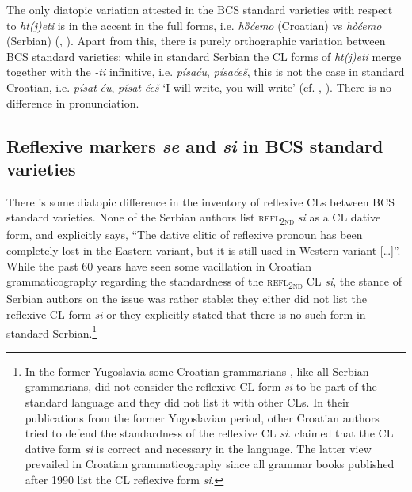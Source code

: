 The only diatopic variation attested in the BCS standard varieties with respect to \textit{ht(j)eti} is in the accent in the full forms, i.e. \textit{hȍćemo} (Croatian) vs \textit{hòćemo} (Serbian) (\citealt[cf.][272]{Baric97}, \citealt[125]{MrazovicVukadinovic09}). Apart from this, there is purely orthographic variation between BCS standard varieties: while in standard Serbian the CL forms of \textit{ht(j)eti} merge together with the \textit{-ti} infinitive, i.e. \textit{písaću}, \textit{písaćeš}, this is not the case in standard Croatian, i.e. \textit{písat} \textit{ću}, \textit{písat} \textit{ćeš} `I will write, you will write' (cf. \citealt[155]{MrazovicVukadinovic09}, \citealt[241]{Baric97}). There is no difference in pronunciation.

\subsection{Reflexive markers \textit{se} and \textit{si} in BCS standard varieties}
\label{Reflexive markers se and si in BCS standard varieties}
There is some diatopic difference in the inventory of reflexive CLs between BCS standard varieties. None of the Serbian authors list \textsc{refl\textsubscript{2nd}} \textit{si} as a CL dative form, and \citet[56]{RadanovicKocic88} explicitly says, “The dative clitic of reflexive pronoun has been completely lost in the Eastern variant, but it is still used in Western variant […]''. While the past 60 years have seen some vacillation in Croatian grammaticography regarding the standardness of the \textsc{refl\textsubscript{2nd}} CL \textit{si}, the stance of Serbian authors on the issue was rather stable: they \citep[e.g.][97]{StanojcicPopovic02} either did not list the reflexive CL form \textit{si} or they \citep[e.g.][367]{MrazovicVukadinovic09} explicitly stated that there is no such form in standard Serbian.\footnote{In the former Yugoslavia some Croatian grammarians \citep[e.g.][96]{BHZ63}, like all Serbian grammarians, did not consider the reflexive CL form \textit{si} to be part of the standard language and they did not list it with other CLs. In their publications from the former Yugoslavian period, other Croatian authors \citep[e.g.][364]{BMPV71} tried to defend the standardness of the reflexive CL \textit{si}. \citet[][364]{BMPV71} claimed that the CL dative form \textit{si} is correct and necessary in the language. The latter view prevailed in Croatian grammaticography since all grammar books published after 1990 list the CL reflexive form \textit{si}.} 


